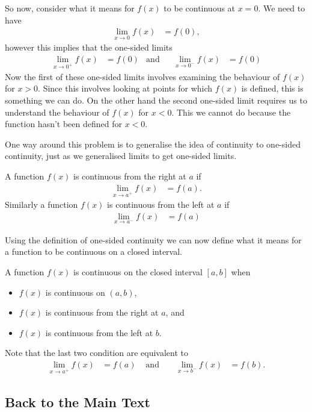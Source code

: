 So now, consider what it means for $f(x)$ to be continuous at $x=0$. We need to have
\begin{align*}
  \lim_{x\to 0} f(x) &= f(0),
\end{align*}
however this implies that the one-sided limits
\begin{align*}
  \lim_{x\to 0^+} f(x) &= f(0) & \text{and}&& \lim_{x\to 0^-} f(x) &= f(0)
\end{align*}
Now the first of these one-sided limits involves examining the behaviour of $f(x)$ for
$x>0$. Since this involves looking at points for which $f(x)$ is defined, this is
something we can do. On the other hand the second one-sided limit requires us to
understand the behaviour of $f(x)$ for $x<0$. This we cannot do because the function
hasn't been defined for $x<0$.

One way around this problem is to generalise the idea of continuity to one-sided
continuity, just as we generalised limits to get one-sided limits.
\begin{defn}
  A function $f(x)$ is continuous from the right at $a$ if
  \begin{align*}
    \lim_{x\to a^+} f(x) &= f(a).
  \end{align*}
  Similarly a function $f(x)$ is continuous from the left at $a$ if
  \begin{align*}
    \lim_{x\to a^-} f(x) &= f(a)
  \end{align*}
\end{defn}

Using the definition of one-sided continuity we can now define what it means for a
function to be continuous on a closed interval.
\begin{defn}
 A function $f(x)$ is continuous on the closed interval $[a,b]$ when
\begin{itemize}
 \item $f(x)$ is continuous on $(a,b)$,
 \item $f(x)$ is continuous from the right at $a$, and
 \item $f(x)$ is continuous from the left at $b$.
\end{itemize}
Note that the last two condition are equivalent to
\begin{align*}
   \lim_{x\to a^+} f(x) &= f(a) & \text{ and }&&
  \lim_{x\to b^-} f(x) &= f(b).
\end{align*}
\end{defn}

\subsection*{Back to the Main Text}


